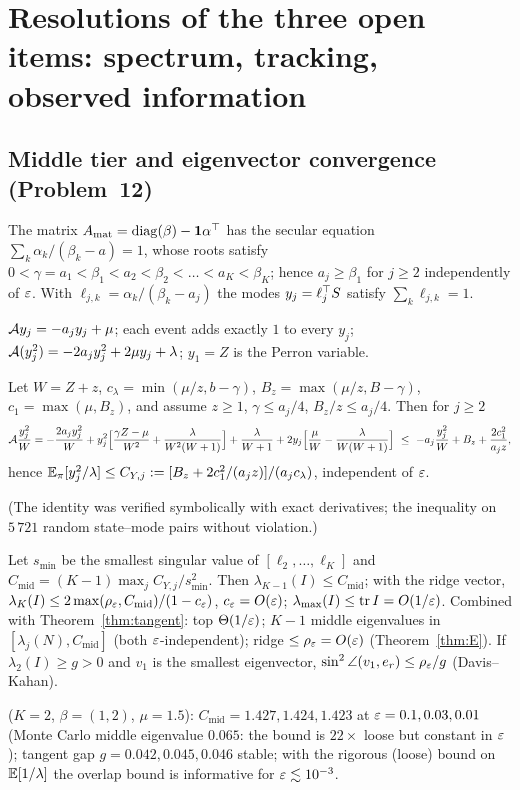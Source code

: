 \section{Resolutions of the three open items: spectrum, tracking, observed information}\label{sec:resolutions}

\subsection{Middle tier and eigenvector convergence (Problem~12)}
The matrix $A_{\mathrm{mat}}=\mathrm{diag}(\beta)-\mathbf1\alpha^{\top}$ has the secular equation $\sum_k\alpha_k/(\beta_k-a)=1$, whose roots satisfy $0<\gamma=a_1<\beta_1<a_2<\beta_2<\dots<a_K<\beta_K$; hence $a_j\ge\beta_1$ for $j\ge2$ independently of $\varepsilon$. With $\ell_{j,k}=\alpha_k/(\beta_k-a_j)$ the modes $y_j=\ell_j^{\top} S$ satisfy $\sum_k\ell_{j,k}=1$.

\begin{lemma}\label{lem:modes}\Pt{}
$\mathcal A y_j=-a_jy_j+\mu$; each event adds exactly $1$ to every $y_j$; $\mathcal A(y_j^2)=-2a_jy_j^2+2\mu y_j+\lambda$; $y_1=Z$ is the Perron variable.
\end{lemma}
\begin{lemma}\label{lem:fastLyap}\Pt{}
Let $W=Z+z$, $c_\lambda=\min(\mu/z,b-\gamma)$, $B_z=\max(\mu/z,B-\gamma)$, $c_1=\max(\mu,B_z)$, and assume $z\ge1$, $\gamma\le a_j/4$, $B_z/z\le a_j/4$. Then for $j\ge2$
\[
\cA\frac{y_j^2}{W}=-\frac{2a_jy_j^2}{W}+y_j^2\Big[\frac{\gamma Z-\mu}{W^2}+\frac\lambda{W^2(W+1)}\Big]+\frac\lambda{W+1}+2y_j\Big[\frac\mu W-\frac\lambda{W(W+1)}\Big]\ \le\ -a_j\frac{y_j^2}W+B_z+\frac{2c_1^2}{a_jz},
\]
hence $\mathbb{E}_\pi[y_j^2/\lambda]\le C_{Y,j}:=[B_z+2c_1^2/(a_jz)]/(a_jc_\lambda)$, independent of $\varepsilon$.
\end{lemma}
(The identity was verified symbolically with exact derivatives; the inequality on $5\,721$ random state--mode pairs without violation.)
\begin{theorem}\label{thm:tiers}\Ps{}
Let $s_{\min}$ be the smallest singular value of $[\ell_2,\dots,\ell_K]$ and $C_{\mathrm{mid}}=(K-1)\max_jC_{Y,j}/s_{\min}^2$. Then $\lambda_{K-1}(I)\le C_{\mathrm{mid}}$; with the ridge vector, $\lambda_K(I)\le2\max(\rho_\varepsilon,C_{\mathrm{mid}})/(1-c_\varepsilon)$, $c_\varepsilon=O(\varepsilon)$; $\lambda_{\max}(I)\le\operatorname{tr} I=O(1/\varepsilon)$. Combined with Theorem~\ref{thm:tangent}: top $\Theta(1/\varepsilon)$; $K-1$ middle eigenvalues in $[\lambda_j(N),C_{\mathrm{mid}}]$ (both $\varepsilon$-independent); ridge $\le\rho_\varepsilon=O(\varepsilon)$ (Theorem~\ref{thm:E}). If $\lambda_2(I)\ge g>0$ and $v_1$ is the smallest eigenvector, $\sin^2\angle(v_1,e_r)\le\rho_\varepsilon/g$ (Davis--Kahan).
\end{theorem}
\Nt{} ($K=2$, $\beta=(1,2)$, $\mu=1.5$): $C_{\mathrm{mid}}=1.427,1.424,1.423$ at $\varepsilon=0.1,0.03,0.01$ (Monte Carlo middle eigenvalue $0.065$: the bound is $22\times$ loose but constant in $\varepsilon$); tangent gap $g=0.042,0.045,0.046$ stable; with the rigorous (loose) bound on $\mathbb{E}[1/\lambda]$ the overlap bound is informative for $\varepsilon\lesssim10^{-3}$.

